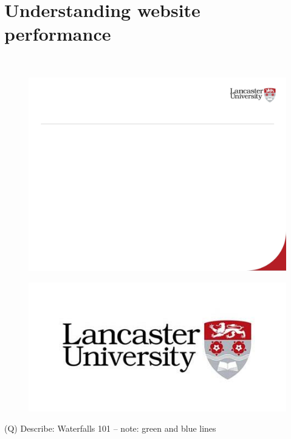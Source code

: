 \documentclass[12pt]{article}
\begin{document}
\section{Understanding website performance}
\\
\begin{figure}[H]
\includegraphics[width=0.5\linewidth]{page36-image-1.png}
\end{figure}
\begin{figure}[H]
\includegraphics[width=0.5\linewidth]{page36-image-2.png}
\end{figure}
\clearpage
(Q)
Describe: Waterfalls 101 – note: green and blue lines
\clearpage
\end{document}
